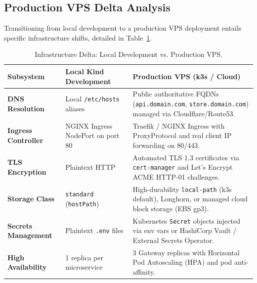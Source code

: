 \documentclass[11pt,a4paper]{article}
\begin{document}
\subsection{Production VPS Delta Analysis}
Transitioning from local development to a production VPS deployment entails specific infrastructure shifts, detailed in Table~\ref{tab:prod_delta}.

\begin{table}[h!]
\centering
\small
\begin{tabularx}{\textwidth}{p{3cm} p{4cm} X}
\toprule
\textbf{Subsystem} & \textbf{Local Kind Development} & \textbf{Production VPS (k3s / Cloud)} \\
\midrule
\textbf{DNS Resolution} & Local \texttt{/etc/hosts} aliases & Public authoritative FQDNs (\texttt{api.domain.com}, \texttt{store.domain.com}) managed via Cloudflare/Route53. \\
\addlinespace
\textbf{Ingress Controller} & NGINX Ingress NodePort on port 80 & Traefik / NGINX Ingress with ProxyProtocol and real client IP forwarding on 80/443. \\
\addlinespace
\textbf{TLS Encryption} & Plaintext HTTP & Automated TLS 1.3 certificates via \texttt{cert-manager} and Let's Encrypt ACME HTTP-01 challenges. \\
\addlinespace
\textbf{Storage Class} & \texttt{standard} (\texttt{hostPath}) & High-durability \texttt{local-path} (k3s default), Longhorn, or managed cloud block storage (EBS gp3). \\
\addlinespace
\textbf{Secrets Management} & Plaintext \texttt{.env} files & Kubernetes \texttt{Secret} objects injected via env vars or HashiCorp Vault / External Secrets Operator. \\
\addlinespace
\textbf{High Availability} & 1 replica per microservice & 3 Gateway replicas with Horizontal Pod Autoscaling (HPA) and pod anti-affinity. \\
\bottomrule
\end{tabularx}
\caption{Infrastructure Delta: Local Development vs. Production VPS.}
\label{tab:prod_delta}
\end{table}
\end{document}
